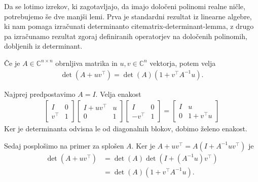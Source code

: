 Da se lotimo izrekov, ki zagotavljajo, da imajo določeni polinomi realne ničle, potrebujemo še dve manjši lemi. Prva je standardni rezultat iz linearne algebre, ki nam pomaga izračunati determinanto cite{matrix-determinant-lemma}, z drugo pa izračunamo rezultat zgoraj definiranih operatorjev na določenih polinomih, dobljenih iz determinant.
\begin{lema}\label{matrix-det-lemma}
    Če je \(A\in \mathbb C^{n\times n}\) obrnljiva matrika in \(u, v \in \mathbb C^n\) vektorja, potem velja
    \begin{align*}
        \det(A + uv^\top) = \det(A) (1 + v^\top A^{-1} u).
    \end{align*}
\end{lema}
\begin{dokaz}
    Najprej predpostavimo \(A=I\). Velja enakost
    \begin{align*}
        \begin{bmatrix}
            I      & 0 \\
            v^\top & 1
        \end{bmatrix}
        \begin{bmatrix}
            I + uv^\top & u \\
            0           & 1
        \end{bmatrix}
        \begin{bmatrix}
            I       & 0 \\
            -v^\top & 1
        \end{bmatrix}
        =
        \begin{bmatrix}
            I & u            \\
            0 & 1 + v^\top u
        \end{bmatrix}
    \end{align*}
    Ker je determinanta odvisna le od diagonalnih blokov, dobimo želeno enakost.

    Sedaj posplošimo na primer za splošen \(A\). Ker je \(A+uv^\top= A(I + A^{-1}uv^\top)\) je
    \begin{align*}
        \det(A + uv^\top) & = \det(A) \det(I + (A^{-1}u)v^\top) \\
                          & = \det(A) (1 + v^\top A^{-1} u).
    \end{align*}
\end{dokaz}

